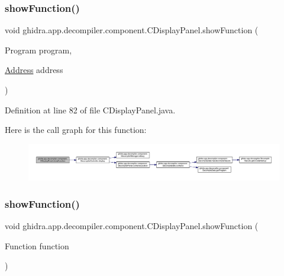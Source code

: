 \subsubsection{\texorpdfstring{showFunction()}{showFunction()}\hspace{0.1cm}{\footnotesize\ttfamily [1/2]}}
{\footnotesize\ttfamily void ghidra.\+app.\+decompiler.\+component.\+C\+Display\+Panel.\+show\+Function (\begin{DoxyParamCaption}\item[{Program}]{program,  }\item[{\mbox{\hyperlink{class_address}{Address}}}]{address }\end{DoxyParamCaption})\hspace{0.3cm}{\ttfamily [inline]}}



Definition at line 82 of file C\+Display\+Panel.\+java.

Here is the call graph for this function\+:
\nopagebreak
\begin{figure}[H]
\begin{center}
\leavevmode
\includegraphics[width=350pt]{classghidra_1_1app_1_1decompiler_1_1component_1_1_c_display_panel_ad26f7df44bd4a50e2d6fe3c3251e667f_cgraph}
\end{center}
\end{figure}
\mbox{\label{classghidra_1_1app_1_1decompiler_1_1component_1_1_c_display_panel_a62c4b0dc99331e02765f481131db23b2}} 
\subsubsection{\texorpdfstring{showFunction()}{showFunction()}\hspace{0.1cm}{\footnotesize\ttfamily [2/2]}}
{\footnotesize\ttfamily void ghidra.\+app.\+decompiler.\+component.\+C\+Display\+Panel.\+show\+Function (\begin{DoxyParamCaption}\item[{Function}]{function }\end{DoxyParamCaption})\hspace{0.3cm}{\ttfamily [inline]}}



